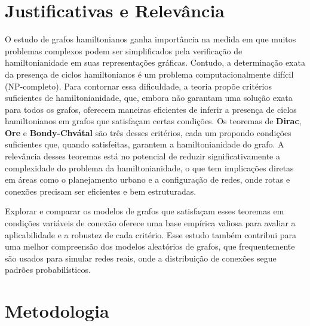 \documentclass[12pt, openright, oneside, a4paper, chapter=TITLE, section=TITLE, subsection=TITLE, subsubsection=TITLE, brazil]{abntex2}
\begin{document}
\section{Justificativas e Relevância}

\hspace{1.25cm}O estudo de grafos hamiltonianos ganha importância na medida em que muitos problemas complexos podem ser simplificados pela verificação de hamiltonianidade em suas representações gráficas. Contudo, a determinação exata da presença de ciclos hamiltonianos é um problema computacionalmente difícil (NP-completo). Para contornar essa dificuldade, a teoria propõe critérios suficientes de hamiltonianidade, que, embora não garantam uma solução exata para todos os grafos, oferecem maneiras eficientes de inferir a presença de ciclos hamiltonianos em grafos que satisfaçam certas condições. Os teoremas de \textbf{Dirac}, \textbf{Ore} e \textbf{Bondy-Chvátal} são três desses critérios, cada um propondo condições suficientes que, quando satisfeitas, garantem a hamiltonianidade do grafo. A relevância desses teoremas está no potencial de reduzir significativamente a complexidade do problema da hamiltonianidade, o que tem implicações diretas em áreas como o planejamento urbano e a configuração de redes, onde rotas e conexões precisam ser eficientes e bem estruturadas.

Explorar e comparar os modelos de grafos que satisfaçam esses teoremas em condições variáveis de conexão oferece uma base empírica valiosa para avaliar a aplicabilidade e a robustez de cada critério. Esse estudo também contribui para uma melhor compreensão dos modelos aleatórios de grafos, que frequentemente são usados para simular redes reais, onde a distribuição de conexões segue padrões probabilísticos.

\section{Metodologia}
\end{document}
